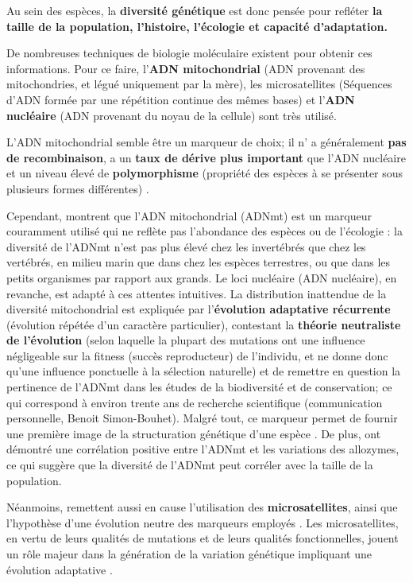 \documentclass[a4paper]{article}
\begin{document}
Au sein des espèces, la \textbf{diversité génétique} est donc pensée pour refléter \textbf{la taille de la population, l'histoire, l'écologie et capacité d'adaptation.} 

De nombreuses techniques de biologie moléculaire existent pour obtenir ces informations. Pour ce faire, l'\textbf{ADN mitochondrial} (ADN provenant des mitochondries, et légué uniquement par la mère), les microsatellites (Séquences d'ADN formée par une répétition continue des mêmes bases) et l'\textbf{ADN nucléaire} (ADN provenant du noyau de la cellule) sont très utilisé. 

L'ADN mitochondrial semble être un marqueur de choix; il n' a généralement \textbf{pas de recombinaison}, a un \textbf{taux de dérive plus important} que l'ADN nucléaire et un niveau élevé de \textbf{polymorphisme} (propriété des espèces à se présenter sous plusieurs formes différentes) \cite{avise2000abandon}\cite{Aurelle:2009:aa}. 

Cependant, \cite{bazin2006population} montrent que l'ADN mitochondrial (ADNmt) est un marqueur couramment utilisé qui ne reflète pas l'abondance des espèces ou de l'écologie : la diversité de l'ADNmt n'est pas plus élevé chez les invertébrés que chez les vertébrés, en milieu marin que dans chez les espèces terrestres, ou que dans les petits organismes par rapport aux grands. Le loci nucléaire (ADN nucléaire), en revanche, est adapté à ces attentes intuitives. La distribution inattendue de la diversité mitochondrial est expliquée par l'\textbf{évolution adaptative récurrente} (évolution répétée d'un caractère particulier), contestant la \textbf{théorie neutraliste de l'évolution} (selon laquelle la plupart des mutations ont une influence négligeable sur la fitness (succès reproducteur) de l'individu, et ne donne donc qu'une influence ponctuelle à la sélection naturelle) et de remettre en question la pertinence de l'ADNmt dans les études de la biodiversité et de conservation; ce qui correspond à environ trente ans de recherche scientifique (communication personnelle, Benoit Simon-Bouhet). Malgré tout, ce marqueur permet de fournir une première image de la structuration génétique d'une espèce \cite{Aurelle:2009:aa}. De plus, \cite{kitchen2008three} ont démontré une corrélation positive entre l'ADNmt et les variations des allozymes, ce qui suggère que la diversité de l'ADNmt peut corréler avec la taille de la population.

Néanmoins, \cite{kashi2006simple} remettent aussi en cause l'utilisation des \textbf{microsatellites}, ainsi que l'hypothèse d'une évolution neutre des marqueurs employés \cite{Aurelle:2009:aa}. Les microsatellites, en vertu de leurs qualités de mutations et de leurs qualités fonctionnelles, jouent un rôle majeur dans la génération de la variation génétique impliquant une évolution adaptative \cite{kashi2006simple}.
\end{document}

